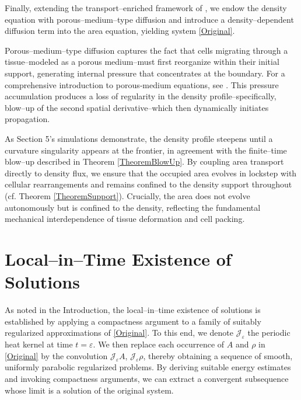 \documentclass[12pt]{amsart}
\newcommand{\e}{\varepsilon}
\newcommand{\J}{\mathcal{J}}
\begin{document}
Finally, extending the transport--enriched framework of \cite{Shraiman2005}, we endow the density equation with porous--medium--type diffusion and introduce a density--dependent diffusion term into the area equation, yielding system \eqref{Original}. 

Porous--medium--type diffusion captures the fact that cells migrating through a tissue--modeled as a porous medium--must first reorganize within their initial support, generating internal pressure that concentrates at the boundary. For a comprehensive introduction to porous‐medium equations, see \cite{vazquez2007porous}. This pressure accumulation produces a loss of regularity in the density profile--specifically, blow--up of the second spatial derivative--which then dynamically initiates propagation. 

As Section 5's simulations demonstrate, the density profile steepens until a curvature singularity appears at the frontier, in agreement with the finite--time blow--up described in Theorem \ref{TheoremBlowUp}. By coupling area transport directly to density flux, we ensure that the occupied area evolves in lockstep with cellular rearrangements and remains confined to the density support throughout (cf. Theorem \ref{TheoremSupport}). Crucially, the area does not evolve autonomously but is confined to the density, reflecting the fundamental mechanical interdependence of tissue deformation and cell packing.  

	
    
\section{Local--in--Time Existence of Solutions}
	\label{sec:2}

As noted in the Introduction, the local--in--time existence of solutions is established by applying a compactness argument to a family of suitably regularized approximations of \eqref{Original}.  To this end, 
we denote $\J_\e$ the periodic heat kernel at time $t=\e$. We then replace each occurrence of $A$ and $\rho$ in \eqref{Original} by the convolution $\J_\e A$, $\J_\e\rho$, thereby obtaining a sequence of smooth, uniformly parabolic regularized problems.  By deriving suitable energy estimates and invoking compactness arguments, we can extract a convergent subsequence whose limit is a solution of the original system.
\end{document}
